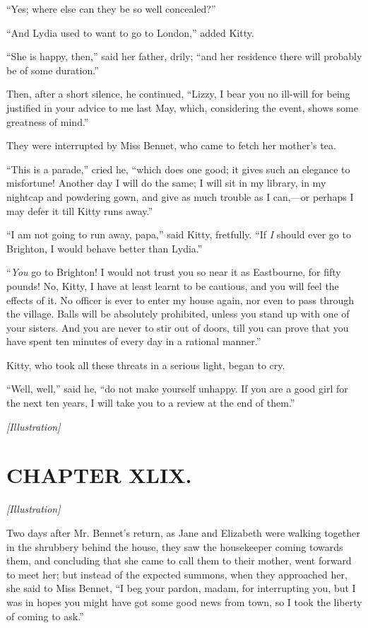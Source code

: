 \documentclass[12pt]{book}
\begin{document}
``Yes; where else can they be so well concealed?''

``And Lydia used to want to go to London,'' added Kitty.

``She is happy, then,'' said her father, drily; ``and her residence there will probably be of some duration.''

Then, after a short silence, he continued, ``Lizzy, I bear you no ill-will for being justified in your advice to me last May, which, considering the event, shows some greatness of mind.''

They were interrupted by Miss Bennet, who came to fetch her mother's tea.

``This is a parade,'' cried he, ``which does one good; it gives such an elegance to misfortune! Another day I will do the same; I will sit in my library, in my nightcap and powdering gown, and give as much trouble as I can,---or perhaps I may defer it till Kitty runs away.''

``I am not going to run away, papa,'' said Kitty, fretfully. ``If \textit{I} should ever go to Brighton, I would behave better than Lydia.''

``\textit{You} go to Brighton! I would not trust you so near it as Eastbourne, for fifty pounds! No, Kitty, I have at least learnt to be cautious, and you will feel the effects of it. No officer is ever to enter my house again, nor even to pass through the village. Balls will be absolutely prohibited, unless you stand up with one of your sisters. And you are never to stir out of doors, till you can prove that you have spent ten minutes of every day in a rational manner.''

Kitty, who took all these threats in a serious light, began to cry.

``Well, well,'' said he, ``do not make yourself unhappy. If you are a good girl for the next ten years, I will take you to a review at the end of them.''

\emph{[Illustration]}

\chapter{CHAPTER XLIX.}

\emph{[Illustration]}

Two days after Mr. Bennet's return, as Jane and Elizabeth were walking together in the shrubbery behind the house, they saw the housekeeper coming towards them, and concluding that she came to call them to their mother, went forward to meet her; but instead of the expected summons, when they approached her, she said to Miss Bennet, ``I beg your pardon, madam, for interrupting you, but I was in hopes you might have got some good news from town, so I took the liberty of coming to ask.''
\end{document}
